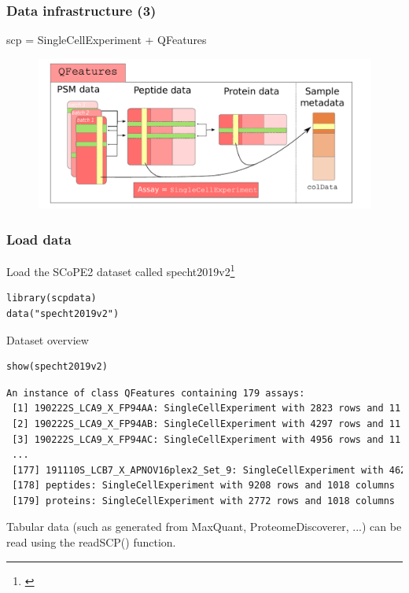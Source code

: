 \documentclass{beamer}
\newcommand{\hcode}[2][lgray]{{\ttfamily\color{vdgray}\colorbox{#1}{#2}}}
\newcommand{\frametitlesection}[1]{\frametitle{\centering #1 \footnotesize \hspace{0pt plus 1 filll} \insertsection}}
\begin{document}
\begin{frame}
    \frametitlesection{Data infrastructure (3)}

    \hcode{scp} = \hcode{SingleCellExperiment} + \hcode{QFeatures}
    \begin{figure}
        \centering
        \includegraphics[width=\linewidth]{figs/SCP_framework.pdf}
    \end{figure}

    
\end{frame}

\begin{frame}[fragile]
    \frametitlesection{Load data}
    
    Load the SCoPE2 dataset called \hcode{specht2019v2}\footnote{\citet{Specht2019-jm}}
    
    \begin{lstlisting}
library(scpdata)
data("specht2019v2")
    \end{lstlisting}
    
    Dataset overview
    
    \begin{lstlisting}
show(specht2019v2)
    \end{lstlisting}
    
    \begin{lstlisting}[language = TeX, numbers = none, basicstyle = \tiny\ttfamily\color{vdgray}]
An instance of class QFeatures containing 179 assays:
 [1] 190222S_LCA9_X_FP94AA: SingleCellExperiment with 2823 rows and 11 col...
 [2] 190222S_LCA9_X_FP94AB: SingleCellExperiment with 4297 rows and 11 col...
 [3] 190222S_LCA9_X_FP94AC: SingleCellExperiment with 4956 rows and 11 col...
 ...
 [177] 191110S_LCB7_X_APNOV16plex2_Set_9: SingleCellExperiment with 4626 r...
 [178] peptides: SingleCellExperiment with 9208 rows and 1018 columns
 [179] proteins: SingleCellExperiment with 2772 rows and 1018 columns
    \end{lstlisting}
    
    \bigskip
    \footnotesize
    
    Tabular data (such as generated from MaxQuant, ProteomeDiscoverer,
    ...) can be read using the \hcode{readSCP()} function.
    
\end{frame}
\end{document}
